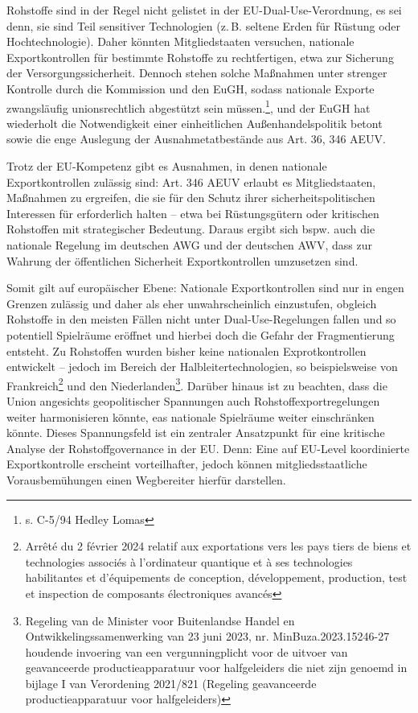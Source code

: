 \documentclass[12pt,a4paper,oneside]{book} %
\begin{document}
Rohstoffe sind in der Regel nicht gelistet in der EU-Dual-Use-Verordnung, es sei denn, sie sind Teil sensitiver Technologien (z. B. seltene Erden für Rüstung oder Hochtechnologie). Daher könnten Mitgliedstaaten versuchen, nationale Exportkontrollen für bestimmte Rohstoffe zu rechtfertigen, etwa zur Sicherung der Versorgungssicherheit. Dennoch stehen solche Maßnahmen unter strenger Kontrolle durch die Kommission und den EuGH, sodass nationale Exporte zwangsläufig unionsrechtlich abgestützt sein müssen.\footnote{s. C-5/94 Hedley Lomas}, und der EuGH hat wiederholt die Notwendigkeit einer einheitlichen Außenhandelspolitik betont sowie die enge Auslegung der Ausnahmetatbestände aus Art. 36, 346 AEUV.


Trotz der EU-Kompetenz gibt es Ausnahmen, in denen nationale Exportkontrollen zulässig sind: Art. 346 AEUV erlaubt es Mitgliedstaaten, Maßnahmen zu ergreifen, die sie für den Schutz ihrer sicherheitspolitischen Interessen für erforderlich halten – etwa bei Rüstungsgütern oder kritischen Rohstoffen mit strategischer Bedeutung. Daraus ergibt sich bspw. auch die nationale Regelung im deutschen AWG und der deutschen AWV, dass zur Wahrung der öffentlichen Sicherheit Exportkontrollen umzusetzen sind.

Somit gilt auf europäischer Ebene: Nationale Exportkontrollen sind nur in engen Grenzen zulässig und daher als eher unwahrscheinlich einzustufen, obgleich Rohstoffe in den meisten Fällen nicht unter Dual-Use-Regelungen fallen und so potentiell Spielräume eröffnet und hierbei doch die Gefahr der Fragmentierung entsteht. Zu Rohstoffen wurden bisher keine nationalen Exprotkontrollen entwickelt -- jedoch im Bereich der Halbleitertechnologien, so beispielsweise von Frankreich\footnote{Arrêté du 2 février 2024 relatif aux exportations vers les pays tiers de biens et technologies associés à l'ordinateur quantique et à ses technologies habilitantes et d'équipements de conception, développement, production, test et inspection de composants électroniques avancés} und den Niederlanden\footnote{Regeling van de Minister voor Buitenlandse Handel en Ontwikkelingssamenwerking van 23 juni 2023, nr. MinBuza.2023.15246-27 houdende invoering van een vergunningplicht voor de uitvoer van geavanceerde productieapparatuur voor halfgeleiders die niet zijn genoemd in bijlage I van Verordening 2021/821 (Regeling geavanceerde productieapparatuur voor halfgeleiders)}.
Darüber hinaus ist zu beachten, dass die Union angesichts geopolitischer Spannungen auch Rohstoffexportregelungen weiter harmonisieren könnte, eas nationale Spielräume weiter einschränken könnte. Dieses Spannungsfeld ist ein zentraler Ansatzpunkt für eine kritische Analyse der Rohstoffgovernance in der EU. Denn: Eine auf EU-Level koordinierte Exportkontrolle erscheint vorteilhafter, jedoch können mitgliedsstaatliche Vorausbemühungen einen Wegbereiter hierfür darstellen.\autocite{Medunic, Nr 15 Juli 2024, S. 3}
\end{document}
